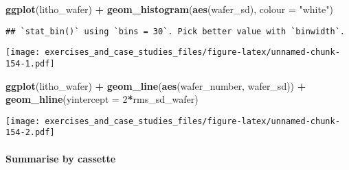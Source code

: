 \documentclass[]{book}
\newenvironment{Shaded}{\begin{snugshade}}{\end{snugshade}}
\newcommand{\DataTypeTok}[1]{\textcolor[rgb]{0.13,0.29,0.53}{#1}}
\newcommand{\DecValTok}[1]{\textcolor[rgb]{0.00,0.00,0.81}{#1}}
\newcommand{\KeywordTok}[1]{\textcolor[rgb]{0.13,0.29,0.53}{\textbf{#1}}}
\newcommand{\NormalTok}[1]{#1}
\newcommand{\OperatorTok}[1]{\textcolor[rgb]{0.81,0.36,0.00}{\textbf{#1}}}
\newcommand{\StringTok}[1]{\textcolor[rgb]{0.31,0.60,0.02}{#1}}
\let\oldparagraph\paragraph
\renewcommand{\paragraph}[1]{\oldparagraph{#1}\mbox{}}
\theoremstyle{definition}
\theoremstyle{definition}
\theoremstyle{definition}
\theoremstyle{remark}
\begin{document}
\begin{Shaded}
\begin{Highlighting}[]
\KeywordTok{ggplot}\NormalTok{(litho_wafer) }\OperatorTok{+}
\StringTok{ }\KeywordTok{geom_histogram}\NormalTok{(}\KeywordTok{aes}\NormalTok{(wafer_sd), }\DataTypeTok{colour =} \StringTok{"white"}\NormalTok{)}
\end{Highlighting}
\end{Shaded}

\begin{verbatim}
## `stat_bin()` using `bins = 30`. Pick better value with `binwidth`.
\end{verbatim}

\texttt{[image: exercises\_and\_case\_studies\_files/figure-latex/unnamed-chunk-154-1.pdf]}

\begin{Shaded}
\begin{Highlighting}[]
\KeywordTok{ggplot}\NormalTok{(litho_wafer) }\OperatorTok{+}
\StringTok{  }\KeywordTok{geom_line}\NormalTok{(}\KeywordTok{aes}\NormalTok{(wafer_number, wafer_sd)) }\OperatorTok{+}
\StringTok{  }\KeywordTok{geom_hline}\NormalTok{(}\DataTypeTok{yintercept =} \DecValTok{2}\OperatorTok{*}\NormalTok{rms_sd_wafer)}
\end{Highlighting}
\end{Shaded}

\texttt{[image: exercises\_and\_case\_studies\_files/figure-latex/unnamed-chunk-154-2.pdf]}

\hypertarget{summarise-by-cassette}{%
\paragraph{Summarise by cassette}\label{summarise-by-cassette}}

\begin{Shaded}
\end{Shaded}
\end{document}
